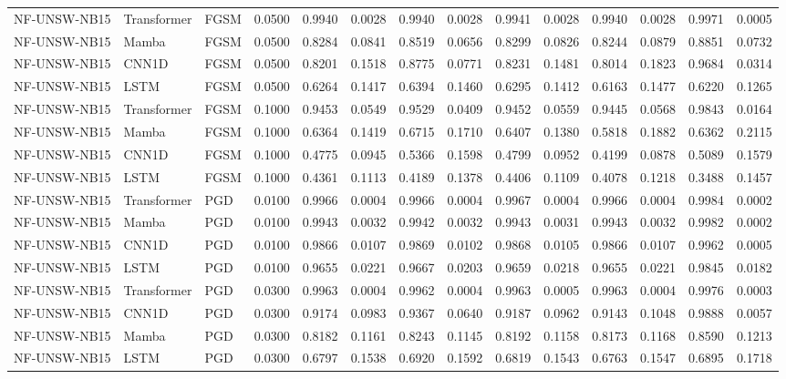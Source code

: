\begin{table}[ht]
\begin{tabular}{lllrrrrrrrrrrr}
NF-UNSW-NB15 & Transformer & FGSM & 0.0500 & 0.9940 & 0.0028 & 0.9940 & 0.0028 & 0.9941 & 0.0028 & 0.9940 & 0.0028 & 0.9971 & 0.0005 \\
NF-UNSW-NB15 & Mamba & FGSM & 0.0500 & 0.8284 & 0.0841 & 0.8519 & 0.0656 & 0.8299 & 0.0826 & 0.8244 & 0.0879 & 0.8851 & 0.0732 \\
NF-UNSW-NB15 & CNN1D & FGSM & 0.0500 & 0.8201 & 0.1518 & 0.8775 & 0.0771 & 0.8231 & 0.1481 & 0.8014 & 0.1823 & 0.9684 & 0.0314 \\
NF-UNSW-NB15 & LSTM & FGSM & 0.0500 & 0.6264 & 0.1417 & 0.6394 & 0.1460 & 0.6295 & 0.1412 & 0.6163 & 0.1477 & 0.6220 & 0.1265 \\
NF-UNSW-NB15 & Transformer & FGSM & 0.1000 & 0.9453 & 0.0549 & 0.9529 & 0.0409 & 0.9452 & 0.0559 & 0.9445 & 0.0568 & 0.9843 & 0.0164 \\
NF-UNSW-NB15 & Mamba & FGSM & 0.1000 & 0.6364 & 0.1419 & 0.6715 & 0.1710 & 0.6407 & 0.1380 & 0.5818 & 0.1882 & 0.6362 & 0.2115 \\
NF-UNSW-NB15 & CNN1D & FGSM & 0.1000 & 0.4775 & 0.0945 & 0.5366 & 0.1598 & 0.4799 & 0.0952 & 0.4199 & 0.0878 & 0.5089 & 0.1579 \\
NF-UNSW-NB15 & LSTM & FGSM & 0.1000 & 0.4361 & 0.1113 & 0.4189 & 0.1378 & 0.4406 & 0.1109 & 0.4078 & 0.1218 & 0.3488 & 0.1457 \\
NF-UNSW-NB15 & Transformer & PGD & 0.0100 & 0.9966 & 0.0004 & 0.9966 & 0.0004 & 0.9967 & 0.0004 & 0.9966 & 0.0004 & 0.9984 & 0.0002 \\
NF-UNSW-NB15 & Mamba & PGD & 0.0100 & 0.9943 & 0.0032 & 0.9942 & 0.0032 & 0.9943 & 0.0031 & 0.9943 & 0.0032 & 0.9982 & 0.0002 \\
NF-UNSW-NB15 & CNN1D & PGD & 0.0100 & 0.9866 & 0.0107 & 0.9869 & 0.0102 & 0.9868 & 0.0105 & 0.9866 & 0.0107 & 0.9962 & 0.0005 \\
NF-UNSW-NB15 & LSTM & PGD & 0.0100 & 0.9655 & 0.0221 & 0.9667 & 0.0203 & 0.9659 & 0.0218 & 0.9655 & 0.0221 & 0.9845 & 0.0182 \\
NF-UNSW-NB15 & Transformer & PGD & 0.0300 & 0.9963 & 0.0004 & 0.9962 & 0.0004 & 0.9963 & 0.0005 & 0.9963 & 0.0004 & 0.9976 & 0.0003 \\
NF-UNSW-NB15 & CNN1D & PGD & 0.0300 & 0.9174 & 0.0983 & 0.9367 & 0.0640 & 0.9187 & 0.0962 & 0.9143 & 0.1048 & 0.9888 & 0.0057 \\
NF-UNSW-NB15 & Mamba & PGD & 0.0300 & 0.8182 & 0.1161 & 0.8243 & 0.1145 & 0.8192 & 0.1158 & 0.8173 & 0.1168 & 0.8590 & 0.1213 \\
NF-UNSW-NB15 & LSTM & PGD & 0.0300 & 0.6797 & 0.1538 & 0.6920 & 0.1592 & 0.6819 & 0.1543 & 0.6763 & 0.1547 & 0.6895 & 0.1718 \\

\end{tabular}
\end{table}
